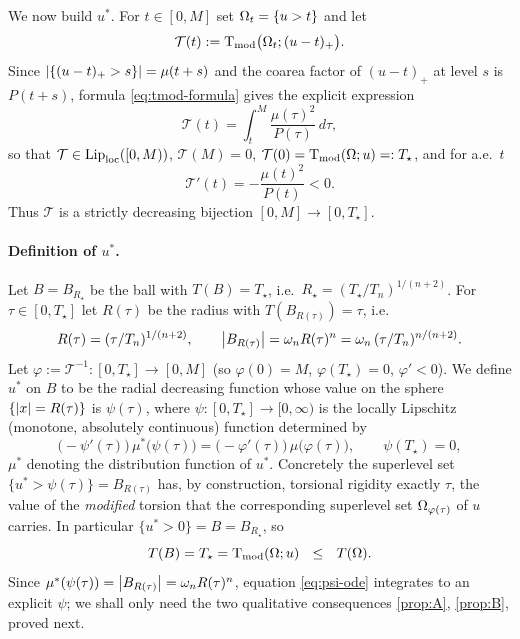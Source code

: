We now build $u^*$. For $t\in[0,M]$ set $\Omega_t=\{u>t\}$ and let
\begin{equation}\label{eq:Tt}
  \mathcal T(t):=\operatorname{T_{\mathrm{mod}}}\bigl(\Omega_t;(u-t)_+\bigr).
\end{equation}
Since $\left|\{(u-t)_+>s\}\right|=\mu(t+s)$ and the coarea factor of $(u-t)_+$ at
level $s$ is $P(t+s)$, formula \eqref{eq:tmod-formula} gives the explicit
expression
\begin{equation}\label{eq:Tt-formula}
  \mathcal T(t)=\int_t^M\frac{\mu(\tau)^2}{P(\tau)}\,d\tau,
\end{equation}
so that $\mathcal T\in\mathrm{Lip}_{\rm loc}([0,M))$, $\mathcal T(M)=0$,
$\mathcal T(0)=\operatorname{T_{\mathrm{mod}}}(\Omega;u)=:T_\star$, and for a.e.\ $t$
\begin{equation}\label{eq:Tprime}
  \mathcal T'(t)=-\frac{\mu(t)^2}{P(t)}<0 .
\end{equation}
Thus $\mathcal T$ is a strictly decreasing bijection $[0,M]\to[0,T_\star]$.

\paragraph{Definition of $u^*$.}
Let $B=B_{R_\star}$ be the ball with $T(B)=T_\star$, i.e.\
$R_\star=(T_\star/T_n)^{1/(n+2)}$. For $\tau\in[0,T_\star]$ let $R(\tau)$ be
the radius with $T(B_{R(\tau)})=\tau$, i.e.\
\begin{equation}\label{eq:Rtau}
  R(\tau)=(\tau/T_n)^{1/(n+2)},\qquad
  \left|B_{R(\tau)}\right|=\omega_n R(\tau)^n
  =\omega_n\,(\tau/T_n)^{n/(n+2)}.
\end{equation}
Let $\varphi:=\mathcal T^{-1}:[0,T_\star]\to[0,M]$ (so $\varphi(0)=M$,
$\varphi(T_\star)=0$, $\varphi'<0$). We define $u^*$ on $B$ to be the radial
decreasing function whose value on the sphere $\{\left|x\right|=R(\tau)\}$ is
$\psi(\tau)$, where $\psi:[0,T_\star]\to[0,\infty)$ is the
locally Lipschitz (monotone, absolutely continuous) function determined by
\begin{equation}\label{eq:psi-ode}
  \bigl(-\psi'(\tau)\bigr)\,\mu^*\!\bigl(\psi(\tau)\bigr)
  =\bigl(-\varphi'(\tau)\bigr)\,\mu\!\bigl(\varphi(\tau)\bigr),
  \qquad \psi(T_\star)=0,
\end{equation}
$\mu^*$ denoting the distribution function of $u^*$. Concretely the
superlevel set $\{u^*>\psi(\tau)\}=B_{R(\tau)}$ has, by construction,
torsional rigidity exactly $\tau$, the value of the \emph{modified}
torsion that the corresponding superlevel set $\Omega_{\varphi(\tau)}$ of $u$
carries. In particular $\{u^*>0\}=B=B_{R_\star}$, so
\begin{equation}\label{eq:TB}
  T(B)=T_\star=\operatorname{T_{\mathrm{mod}}}(\Omega;u)\ \ \le\ \ T(\Omega).
\end{equation}
Since $\mu^*(\psi(\tau))=\left|B_{R(\tau)}\right|=\omega_n R(\tau)^n$, equation
\eqref{eq:psi-ode} integrates to an explicit $\psi$; we shall only need the
two qualitative consequences \ref{prop:A}, \ref{prop:B}, proved next.


